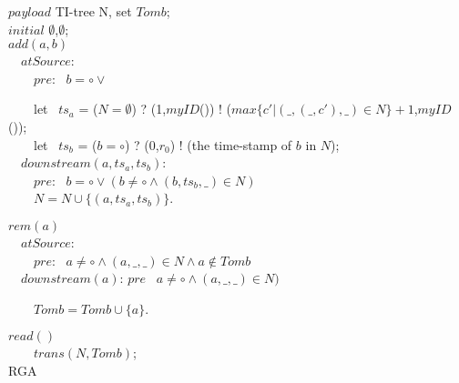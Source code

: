 \renewcommand{\algorithmcfname}{CRDT Implementation}
\noindent
\noindent\begin{algorithm}[H]
$\mathit{payload}$ TI-tree N, set $\mathit{Tomb}$; \\
$\mathit{initial}$ $\emptyset$,$\emptyset$; \\

$add(a,b)$ \\
\ \ $\mathit{atSource}$: \\
\ \ \ \ $\mathit{pre}$: \ $b = \circ \vee$ %



\ \ \ \ let \ $ts_a$ = ($N = \emptyset$) ? (1,$\mathit{myID}$()) ! ($\mathit{max}\{ c' \vert (\_,(\_,c'),\_) \in N \} +1$,$\mathit{myID}$()); \\
\ \ \ \ let \ $ts_b$ = ($b = \circ$) ? (0,$r_0$) ! (the time-stamp of $b$ in $N$); \\

\ \ $\mathit{downstream}(a,ts_a,ts_b)$: \\
\ \ \ \ $\mathit{pre}$: \ $b = \circ \vee ( b \neq \circ \wedge (b,ts_b,\_) \in N)$ \\

\ \ \ \ $N = N \cup \{ (a,ts_a,ts_b) \}$.


$rem(a)$ \\
\ \ $\mathit{atSource}$: \\
\ \ \ \ $\mathit{pre}$: \ $a \neq \circ \wedge (a,\_,\_) \in N \wedge a \notin \mathit{Tomb}$ \\

\ \ $\mathit{downstream}(a)$: $\mathit{pre}$ \ $a \neq \circ \wedge (a,\_,\_) \in N)$

\ \ \ \ $\mathit{Tomb} = \mathit{Tomb} \cup \{ a \}$.

$read()$ \\
\ \ \ \ \KwRet $\mathit{trans}(N,\mathit{Tomb})$; \\

\caption{RGA}
\label{Method-rga}
\end{algorithm}

